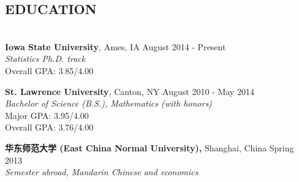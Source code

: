 \documentclass[10pt]{res} %
\begin{document}
\begin{CJK*}{UTF8}{gbsn} %



\address{
{\bf Campus Address:} \\
2410 Snedecor Hall \\
Department of Statistics \\
Iowa State University \\ 
Ames, IA 50010 \\} 

\address{
{\bf Contact Information:} \\
Email: \texttt{epwalsh@iastate.edu} \\
Website: \texttt{epwalsh.com}} 

\begin{resume}


\section{EDUCATION}

\hrulefill \\ %
{\bf Iowa State University}, Ames, IA \hfill August 2014 - Present \\
{\sl Statistics Ph.D. track} \\
Overall GPA: 3.85/4.00

{\bf St. Lawrence University}, Canton, NY \hfill August 2010 - May 2014 \\
{\sl Bachelor of Science (B.S.), Mathematics (with honors)} \\
Major GPA: 3.95/4.00 \\
Overall GPA: 3.76/4.00 

{\bf 华东师范大学 (East China Normal University),} Shanghai, China \hfill Spring 2013 \\
{\sl Semester abroad, Mandarin Chinese and economics} 



\end{resume}
\end{CJK*}
\end{document}
